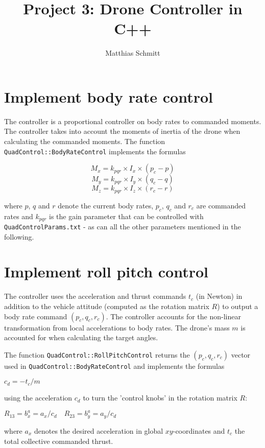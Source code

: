\documentclass[12pt]{article}
\begin{document}
\title{Project 3: Drone Controller in C++}%
\author{Matthias Schmitt}%

\maketitle
\section{Implement body rate control}

The controller is a proportional controller on body rates to commanded moments. The controller takes into account the moments of inertia of the drone when calculating the commanded moments. The function \verb+QuadControl::BodyRateControl+ implements the formulas

$$M_x = k_{pqr} \times I_x \times (p_c - p)$$
$$M_y = k_{pqr} \times I_y \times (q_c - q)$$
$$M_z = k_{pqr} \times I_z \times (r_c - r)$$

where $p$, $q$ and $r$ denote the current body rates, $p_c$, $q_c$ and $r_c$ are commanded rates and $k_{pqr}$ is the gain parameter that can be controlled with \verb+QuadControlParams.txt+ - as can all the other parameters mentioned in the following.

\section{Implement roll pitch control}

The controller uses the acceleration and thrust commands $t_c$ (in Newton) in addition to the vehicle attitude (computed as the rotation matrix $R$) to output a body rate command $(p_c,q_c,r_c)$. The controller accounts for the non-linear transformation from local accelerations to body rates. The drone's mass $m$ is accounted for when calculating the target angles.

The function \verb+QuadControl::RollPitchControl+ returns the $(p_c,q_c,r_c)$ vector used in \verb+QuadControl::BodyRateControl+ and implements the formulas

$c_d = -t_c/m$

using the acceleration $c_d$ to turn the 'control knobs' in the rotation matrix $R$:

$R_{13} = b_x^a = a_x / c_d  \quad R_{23}= b_y^a = a_y / c_d$

where $a_x$ denotes the desired acceleration in global $xy$-coordinates and $t_c$ the total collective commanded thrust.
\end{document}
